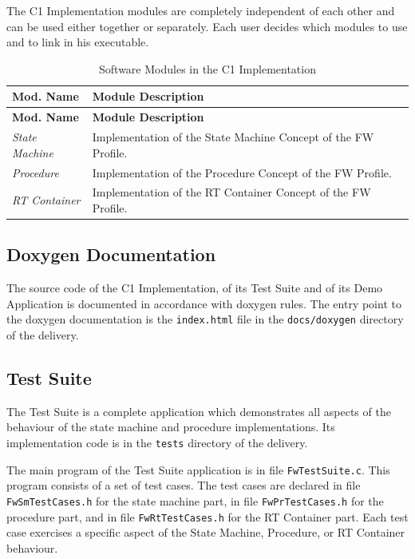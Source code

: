 \documentclass[a4paper,10pt]{article}
\begin{document}
The C1 Implementation modules are completely independent of each other and can be used either together or separately. Each user decides which modules to use and to link in his executable.

\begin{longtable}{|p{2.3cm}|p{6.4cm}|}
\caption{Software Modules in the C1 Implementation} \label{tab:swpkg}\\
\hline
\rowcolor{gray}
\textbf{Mod. Name} & \textbf{Module Description} \\
\hline\hline
\endfirsthead
\rowcolor{gray}
\textbf{Mod. Name} & \textbf{Module Description} \\
\hline\hline
\endhead
%
\emph{State Machine} & Implementation of the State Machine Concept of the FW Profile. \\
\hline
\emph{Procedure} & Implementation of the Procedure Concept of the FW Profile. \\
\hline
\emph{RT Container} & Implementation of the RT Container Concept of the FW Profile. \\
\hline
\end{longtable}

\subsection{Doxygen Documentation}\label{sec:doxygenDoc}
The source code of the C1 Implementation, of its Test Suite and of its Demo Application is documented in accordance with doxygen rules. The entry point to the doxygen documentation is the \texttt{index.html} file in the \texttt{docs/doxygen} directory of the delivery.

\subsection{Test Suite}\label{sec:testSuite}
The Test Suite is a complete application which demonstrates all aspects of the behaviour of the state machine and procedure implementations. Its implementation code is in the \texttt{tests} directory of the delivery.

The main program of the Test Suite application is in file \texttt{FwTestSuite.c}. 
This program consists of a set of test cases. 
The test cases are declared in file \texttt{FwSmTestCases.h} for the state machine part, in file \texttt{FwPrTestCases.h} for the procedure part, and in file \texttt{FwRtTestCases.h} for the RT Container part. 
Each test case exercises a specific aspect of the State Machine, Procedure, or RT Container behaviour.
\end{document}

